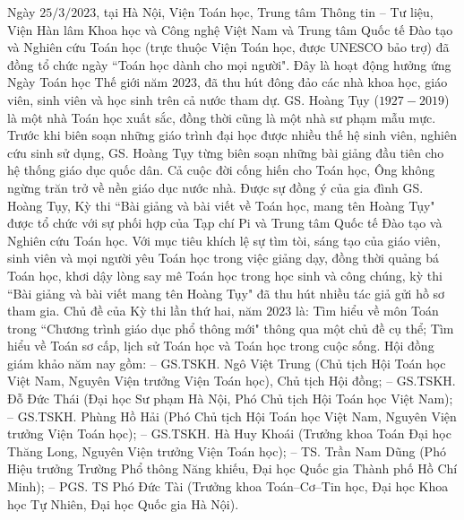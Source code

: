 \vspace*{230pt}


\begin{multicols}{2}	
	Ngày $25/3/2023$, tại Hà Nội, Viện Toán học, Trung tâm Thông tin -- Tư liệu, Viện Hàn lâm Khoa học và Công nghệ Việt Nam và Trung tâm Quốc tế Đào tạo và Nghiên cứu Toán học (trực thuộc Viện Toán học, được UNESCO bảo trợ) đã đồng tổ chức ngày ``Toán học dành cho mọi người". Đây là hoạt động hưởng ứng Ngày Toán học Thế giới năm $2023$, đã thu hút đông đảo các nhà khoa học, giáo viên, sinh viên và học sinh trên cả nước tham dự.
	\vskip 0.1cm
	GS. Hoàng Tụy ($1927 - 2019$) là một nhà Toán học xuất sắc, đồng thời cũng là một nhà sư phạm mẫu mực. Trước khi biên soạn những giáo trình đại học được nhiều thế hệ sinh viên, nghiên cứu sinh sử dụng, GS. Hoàng Tụy từng biên soạn những bài giảng đầu tiên cho hệ thống giáo dục quốc dân. Cả cuộc đời cống hiến cho Toán học, Ông không ngừng trăn trở về nền giáo dục nước nhà. Được sự đồng ý của gia đình GS. Hoàng Tụy, Kỳ thi ``Bài giảng và bài viết về Toán học, mang tên Hoàng Tụy" được tổ chức với sự phối hợp của Tạp chí Pi và Trung tâm Quốc tế Đào tạo và Nghiên cứu Toán học.
	\vskip 0.1cm
	Với mục tiêu khích lệ sự tìm tòi, sáng tạo của giáo viên, sinh viên và mọi người yêu Toán học trong việc giảng dạy, đồng thời quảng bá Toán học, khơi dậy lòng say mê Toán học trong học sinh và công chúng, kỳ thi ``Bài giảng và bài viết mang tên Hoàng Tụy" đã thu hút nhiều tác giả gửi hồ sơ tham gia. 
	\vskip 0.1cm
	Chủ đề của Kỳ thi lần thứ hai, năm $2023$ là: Tìm hiểu về môn Toán trong 	``Chương trình giáo dục phổ thông mới" thông qua một chủ đề cụ thể; Tìm hiểu về Toán sơ cấp, lịch sử Toán học và Toán học trong cuộc sống. Hội đồng giám khảo năm nay gồm: 
	\vskip 0.1cm
	--	GS.TSKH. Ngô Việt Trung (Chủ tịch Hội Toán học Việt Nam, Nguyên Viện trưởng Viện Toán học), Chủ tịch Hội đồng;
	\vskip 0.1cm 
	--	GS.TSKH. Đỗ Đức Thái (Đại học Sư phạm Hà Nội, Phó Chủ tịch Hội Toán học Việt Nam);
	\vskip 0.1cm
	--	GS.TSKH. Phùng Hồ Hải (Phó Chủ tịch Hội Toán học Việt Nam, Nguyên Viện trưởng Viện Toán học);
	\vskip 0.1cm
	--	GS.TSKH. Hà Huy Khoái (Trưởng khoa Toán Đại học Thăng Long, Nguyên Viện trưởng Viện Toán học);
	\vskip 0.1cm
	--	TS. Trần Nam Dũng (Phó Hiệu trưởng Trường Phổ thông Năng khiếu, Đại học Quốc gia Thành phố Hồ Chí Minh);
	\vskip 0.1cm
	--	PGS. TS Phó Đức Tài (Trưởng khoa Toán--Cơ--Tin học, Đại học Khoa học Tự Nhiên, Đại học Quốc gia Hà Nội).
	\begin{figure}[H]
		\vspace*{-5pt}
		\centering
		\captionsetup{labelformat= empty, justification=centering}

\end{figure}
\end{multicols}
